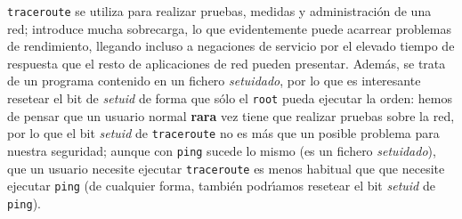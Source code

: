 {\tt traceroute} se utiliza para realizar pruebas, medidas y administraci\'on
de una red; introduce mucha sobrecarga, lo que evidentemente puede acarrear
problemas de rendimiento, llegando incluso a negaciones de servicio por el
elevado tiempo de respuesta que el resto de aplicaciones de red pueden 
presentar. Adem\'as, se trata de un programa contenido en un fichero {\it
setuidado}, por lo que es interesante resetear el bit de {\it setuid} de 
forma que s\'olo el {\tt root} pueda ejecutar la orden: hemos de pensar que un 
usuario normal {\bf rara} vez tiene que realizar pruebas sobre la red, por lo
que el bit {\it setuid} de {\tt traceroute} no es m\'as que un posible 
problema para nuestra seguridad; aunque con {\tt ping} sucede lo mismo (es
un fichero {\it setuidado}), que un usuario necesite ejecutar {\tt traceroute}
es menos habitual que que necesite ejecutar {\tt ping} (de cualquier forma,
tambi\'en podr\'{\i}amos resetear el bit {\it setuid} de {\tt ping}).
